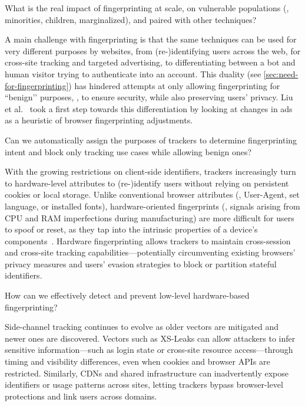 \begin{opbox}
What is the real impact of fingerprinting at scale, on vulnerable populations (\eg{}, minorities, children, marginalized), and paired with other techniques?
\end{opbox}


A main challenge with fingerprinting is that the same techniques can be used for very different purposes by websites, from (re-)identifying users across the web, for cross-site tracking and targeted advertising, to differentiating between a bot and human visitor trying to authenticate into an account. This duality (see \autoref{sec:need-for-fingerprinting}) has hindered attempts at only allowing fingerprinting for ``benign’’ purposes, \ie{}, to ensure security, while also preserving users' privacy. Liu et al.~\cite{liuFirstEarlyEvidence2025} took a first step towards this differentiation by looking at changes in ads as a heuristic of browser fingerprinting adjustments.

\begin{opbox}
Can we automatically assign the purposes of trackers to determine fingerprinting intent and block only tracking use cases while allowing benign ones?
\end{opbox}


With the growing restrictions on client-side identifiers, trackers increasingly turn to hardware-level attributes to (re-)identify users without relying on persistent cookies or local storage.
%
Unlike conventional browser attributes (\eg{}, User-Agent, set language, or installed fonts), hardware-oriented fingerprints (\eg{}, signals arising from CPU and RAM imperfections during manufacturing) are more difficult for users to spoof or reset, as they tap into the intrinsic properties of a device’s components~\cite{venugopalanFPRowhammerDRAMBasedDevice2024}.
%
Hardware fingerprinting allows trackers to maintain cross-session and cross-site tracking capabilities---potentially circumventing existing browsers' privacy measures and users' evasion strategies to block or partition stateful identifiers.

\begin{opbox}
How can we effectively detect and prevent low-level hardware-based fingerprinting?
\end{opbox}



%
Side-channel tracking continues to evolve as older vectors are mitigated and newer ones are discovered. 
%
Vectors such as XS-Leaks can allow attackers to infer sensitive information---such as login state or cross-site resource access---through timing and visibility differences, even when cookies and browser APIs are restricted. 
%
Similarly, CDNs and shared infrastructure can inadvertently expose identifiers or usage patterns across sites, letting trackers bypass browser-level protections and link users across domains.


